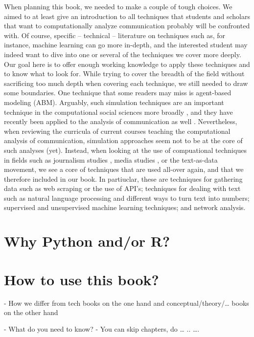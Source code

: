 When planning this book, we needed to make a couple of tough
choices. We aimed to at least give an introduction to all techniques
that students and scholars that want to computationally analyze
communication probably will be confronted with. Of course, specific --
technical -- literature on techniques such as, for instance, machine
learning can go more in-depth, and the interested student may indeed
want to dive into one or several of the techniques we cover more
deeply. Our goal here is to offer enough working knowledge to apply
these techniques and to know what to look for.  While trying to cover
the breadth of the field without sacrificing too much depth when
covering each technique, we still needed to draw some boundaries. One
technique that some readers may miss is agent-based modeling
(ABM). Arguably, such simulation techniques are an important technique
in the computational social sciences more broadly
\citep{cioffi-revilla2014}, and they have recently been applied to the
analysis of communication as well
\citep{Waldherr2014,Wettstein2020}. Nevertheless, when reviewing the
curricula of current courses teaching the computational analysis of
communication, simulation approaches seem not to be at the core of
such analyses (yet).  Instead, when looking at the use of compuational
techniques in fields such as journalism studies
\citep[e.g.,][]{Boumans2016}, media studies , or
the text-as-data movement, we see a core of
techniques that are used all-over again, and that we therefore
included in our book. In partiuclar, these are techniques for
gathering data such as web scraping or the use of API's; techniques
for dealing with text such as natural language processing and
different ways to turn text into numbers; supervised and unsupervised
machine learning techniques; and network analysis.




\section{Why Python and/or R?}


\section{How to use this book?}


- How we differ from tech books on the one hand and conceptual/theory/… books on the other hand


- What do you need to know?
- You can skip chapters, do … .. ….


